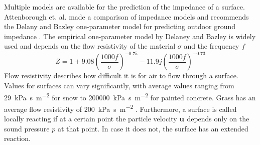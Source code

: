 Multiple models are available for the prediction of the impedance of a surface.
Attenborough et. al. made a comparison of impedance models and recommends the
Delany and Bazley one-parameter model for predicting outdoor ground impedance
\cite{Attenborough2011a}. The empirical one-parameter model by Delaney and
Bazley is widely used and depends on the flow resistivity of the material
$\sigma$ and the frequency $f$
\begin{equation}\label{eq:theory:sound:impedance:db}
 Z = 1 + 9.08 \left( \frac{1000f}{\sigma}\right)^{-0.75} - 11.9 j \left( \frac{1000f}{\sigma}\right)^{-0.73}
\end{equation}
Flow resistivity describes how difficult it is for air to flow through a
surface. Values for surfaces can vary significantly, with average values ranging
from \SI{29}{\kilo\pascal\second\per\square\meter} for snow to
\SI{200000}{\kilo\pascal\second\per\square\meter} for painted concrete. Grass
has an average flow resistivity of
\SI{200}{\kilo\pascal\second\per\square\meter} \cite{Crocker1997}.
Furthermore, a surface is called locally reacting if at a certain point the
particle velocity $\mathbf{u}$ depends only on the sound pressure $p$ at that
point. In case it does not, the surface has an extended reaction.
%


%

%
%
%


